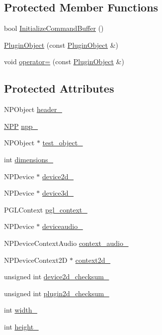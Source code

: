 \subsection*{Protected Member Functions}
\begin{DoxyCompactItemize}
\item 
bool \hyperlink{class_plugin_object_add4437ed89953c9617ef7bd07ae32194}{InitializeCommandBuffer} ()
\item 
\hyperlink{class_plugin_object_ae85850715a04982f81d10136eca3b4f0}{PluginObject} (const \hyperlink{class_plugin_object}{PluginObject} \&)
\item 
void \hyperlink{class_plugin_object_a45243a3f962f41eb71fe0eeba7501262}{operator=} (const \hyperlink{class_plugin_object}{PluginObject} \&)
\end{DoxyCompactItemize}
\subsection*{Protected Attributes}
\begin{DoxyCompactItemize}
\item 
NPObject \hyperlink{class_plugin_object_a2d49cd1ca32c2522400d2505bd3e357e}{header\_\-}
\item 
\hyperlink{struct___n_p_p}{NPP} \hyperlink{class_plugin_object_a73abf33dbc703aaab8c133b4fc16a6f4}{npp\_\-}
\item 
NPObject $\ast$ \hyperlink{class_plugin_object_aa643ef173ea31331094fbf809d87b70d}{test\_\-object\_\-}
\item 
int \hyperlink{class_plugin_object_a60f6c920af50735f647d1715d7a27384}{dimensions\_\-}
\item 
NPDevice $\ast$ \hyperlink{class_plugin_object_a32c9649b557037cc8fbbf95f8c126c15}{device2d\_\-}
\item 
NPDevice $\ast$ \hyperlink{class_plugin_object_af2fd117655e58027408e3cde1f7283fb}{device3d\_\-}
\item 
PGLContext \hyperlink{class_plugin_object_a3819f8c68ea54fa3717c1487e288ee88}{pgl\_\-context\_\-}
\item 
NPDevice $\ast$ \hyperlink{class_plugin_object_aec43fcb4f77ce50598bb1851b100d045}{deviceaudio\_\-}
\item 
NPDeviceContextAudio \hyperlink{class_plugin_object_a29a7c72b105825ff135a29c9af9206f2}{context\_\-audio\_\-}
\item 
NPDeviceContext2D $\ast$ \hyperlink{class_plugin_object_ac4e47e096e7046c00152e0979a120059}{context2d\_\-}
\item 
unsigned int \hyperlink{class_plugin_object_ac792c1966624836cbbadf26eaeae4e52}{device2d\_\-checksum\_\-}
\item 
unsigned int \hyperlink{class_plugin_object_a1efe762777df7a3fc4b879d723598ef7}{plugin2d\_\-checksum\_\-}
\item 
int \hyperlink{class_plugin_object_a2aa3a91e29c0c89a9c887aaba1f1b9d0}{width\_\-}
\item 
int \hyperlink{class_plugin_object_af5872be14fbb29cf6cdf6df495766dd1}{height\_\-}
\end{DoxyCompactItemize}


